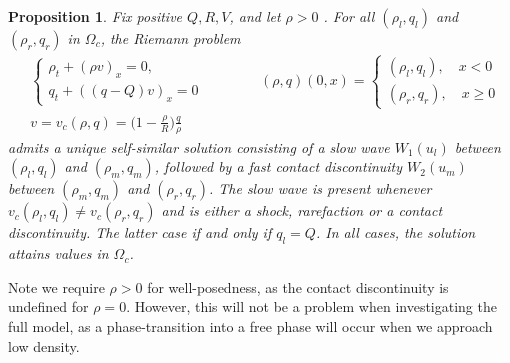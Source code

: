 \documentclass{article}
\newtheorem{proposition}{Proposition}[theorem]
\numberwithin{equation}{section}
\begin{document}
\begin{proposition}
Fix positive $Q, R, V$, and let $\rho > 0$ . For all $(\rho_l, q_l)$ and $(\rho_r, q_r)$ in $\Omega_c$, the Riemann problem \begin{align}
    &\begin{cases}
    \rho_t + (\rho v )_x = 0 , \\
    q_t + ((q-Q)v)_x = 0 
    \end{cases}  \quad \quad \quad \quad  (\rho, q) (0,x) = \begin{cases}
    (\rho_l, q_l), \quad  x < 0 \\
    (\rho_r, q_r), \quad  x \geq 0
    \end{cases} \\
    & v = v_c(\rho,q) = \big(1 - \frac{\rho}{R}\big)\frac{q}{\rho}
    \label{Eq:phase-tranision}
\end{align}admits a unique self-similar solution consisting of a slow wave $W_1(u_l)$ between  $(\rho_l, q_l)$ and  $(\rho_m, q_m)$, followed by a fast contact discontinuity  $W_2(u_m)$ between  $(\rho_m, q_m)$ and  $(\rho_r, q_r)$. The slow wave is present whenever $v_c(\rho_l, q_l) \neq v_c(\rho_r, q_r)$ and is either a shock, rarefaction or a contact discontinuity. The latter case if and only if $q_l = Q$. In all cases, the solution attains values in $\Omega_c$.

\end{proposition}
Note we require $\rho > 0$ for well-posedness, as the contact discontinuity is undefined for $\rho = 0$. However, this will not be a problem when investigating the full model, as a phase-transition into a free phase will occur when we approach low density. 
\end{document}
